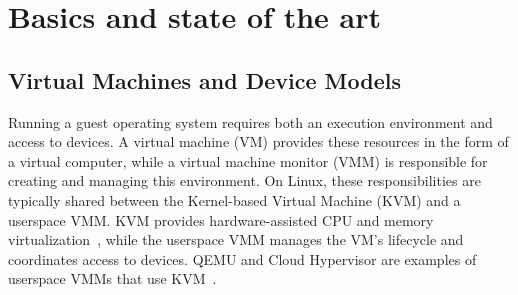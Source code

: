 \chapter{Basics and state of the art}
\label{sec:state}






\section{Virtual Machines and Device Models}
\label{sec:state:virtualization}

Running a guest operating system requires both an execution environment and
access to devices. A virtual machine (VM) provides these resources in the 
form of a virtual computer, while a virtual machine monitor (VMM) is responsible 
for creating and managing this environment.
On Linux, these responsibilities are typically shared between the Kernel-based 
Virtual Machine (KVM) and a userspace VMM. KVM provides hardware-assisted CPU 
and memory virtualization~\cite{kivity2007kvm}, while the userspace VMM manages 
the VM's lifecycle and coordinates access to devices.
QEMU and Cloud Hypervisor are examples of userspace VMMs that use KVM~\cite{johnson2021vfio,cloud-hypervisor}.

